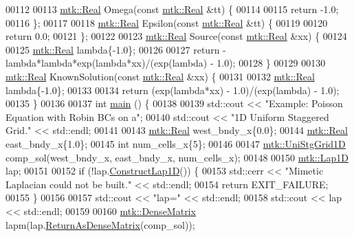 \begin{DoxyCode}
00112 
00113 \hyperlink{group__c01-roots_gac080bbbf5cbb5502c9f00405f894857d}{mtk::Real} Omega(\textcolor{keyword}{const} \hyperlink{group__c01-roots_gac080bbbf5cbb5502c9f00405f894857d}{mtk::Real} &tt) \{
00114 
00115   \textcolor{keywordflow}{return} -1.0;
00116 \};
00117 
00118 \hyperlink{group__c01-roots_gac080bbbf5cbb5502c9f00405f894857d}{mtk::Real} Epsilon(\textcolor{keyword}{const} \hyperlink{group__c01-roots_gac080bbbf5cbb5502c9f00405f894857d}{mtk::Real} &tt) \{
00119 
00120   \textcolor{keywordflow}{return} 0.0;
00121 \};
00122 
00123 \hyperlink{group__c01-roots_gac080bbbf5cbb5502c9f00405f894857d}{mtk::Real} Source(\textcolor{keyword}{const} \hyperlink{group__c01-roots_gac080bbbf5cbb5502c9f00405f894857d}{mtk::Real} &xx) \{
00124 
00125   \hyperlink{group__c01-roots_gac080bbbf5cbb5502c9f00405f894857d}{mtk::Real} lambda\{-1.0\};
00126 
00127   \textcolor{keywordflow}{return} -lambda*lambda*exp(lambda*xx)/(exp(lambda) - 1.0);
00128 \}
00129 
00130 \hyperlink{group__c01-roots_gac080bbbf5cbb5502c9f00405f894857d}{mtk::Real} KnownSolution(\textcolor{keyword}{const} \hyperlink{group__c01-roots_gac080bbbf5cbb5502c9f00405f894857d}{mtk::Real} &xx) \{
00131 
00132   \hyperlink{group__c01-roots_gac080bbbf5cbb5502c9f00405f894857d}{mtk::Real} lambda\{-1.0\};
00133 
00134   \textcolor{keywordflow}{return} (exp(lambda*xx) - 1.0)/(exp(lambda) - 1.0);
00135 \}
00136 
00137 \textcolor{keywordtype}{int} \hyperlink{poisson__1d_8cc_ae66f6b31b5ad750f1fe042a706a4e3d4}{main} () \{
00138 
00139   std::cout << \textcolor{stringliteral}{"Example: Poisson Equation with Robin BCs on a"};
00140   std::cout << \textcolor{stringliteral}{"1D Uniform Staggered Grid."} << std::endl;
00141 
00143   \hyperlink{group__c01-roots_gac080bbbf5cbb5502c9f00405f894857d}{mtk::Real} west\_bndy\_x\{0.0\};
00144   \hyperlink{group__c01-roots_gac080bbbf5cbb5502c9f00405f894857d}{mtk::Real} east\_bndy\_x\{1.0\};
00145   \textcolor{keywordtype}{int} num\_cells\_x\{5\};
00146 
00147   \hyperlink{classmtk_1_1UniStgGrid1D}{mtk::UniStgGrid1D} comp\_sol(west\_bndy\_x, east\_bndy\_x, num\_cells\_x);
00148 
00150   \hyperlink{classmtk_1_1Lap1D}{mtk::Lap1D} lap;
00151 
00152   \textcolor{keywordflow}{if} (!lap.\hyperlink{classmtk_1_1Lap1D_a685dcba88c08cf5b7b6c2aa4669a472c}{ConstructLap1D}()) \{
00153     std::cerr << \textcolor{stringliteral}{"Mimetic Laplacian could not be built."} << std::endl;
00154     \textcolor{keywordflow}{return} EXIT\_FAILURE;
00155   \}
00156 
00157   std::cout << \textcolor{stringliteral}{"lap="} << std::endl;
00158   std::cout << lap << std::endl;
00159 
00160   \hyperlink{classmtk_1_1DenseMatrix}{mtk::DenseMatrix} lapm(lap.\hyperlink{classmtk_1_1Lap1D_aaea34a17b0879e05eb4109645a2ba8f4}{ReturnAsDenseMatrix}(comp\_sol));

\end{DoxyCode}
